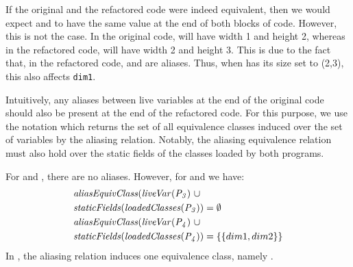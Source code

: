 \documentclass[sigconf,review,anonymous]{acmart}
\begin{document}
\begin{example}
If the original and the refactored code were indeed equivalent,
then we would expect  and  to have the same value at the end of both blocks of code. 
However, this is not the case.
In the original code,  will have width 1 and height 2, whereas in the refactored code,
 will have width 2 and height 3. This is due to the fact that,
in the refactored code,  and  are aliases. %
Thus, when  has its size set to (2,3), this also affects \lstinline[breaklines=true]{dim1}.
\end{example}  

Intuitively, any aliases between live variables at the end of the original code should also
be present at the end of the refactored code. For this purpose, we use the notation
 which returns the set of all equivalence classes induced over the
set of variables  by the aliasing relation.  
Notably, the aliasing equivalence relation must also hold over the
static fields of the classes loaded by both programs.


\begin{example}
For  and , there are no aliases. 
%
However, for  and  we have:
\[
\begin{aligned}[t]
  &\mathit{{aliasEquivClass(liveVar(P_3)}}~ \cup\\
  &\mathit{{staticFields(loadedClasses(P_3))}} = \emptyset\\
  &\mathit{{aliasEquivClass(liveVar(P_4)}} ~\cup\\
  &\mathit{{staticFields(loadedClasses(P_4))}} = \{\{dim1, dim2\}\} 
\end{aligned}
\]
In , the aliasing relation induces one equivalence class, namely .

\end{example}
  
\end{document}
